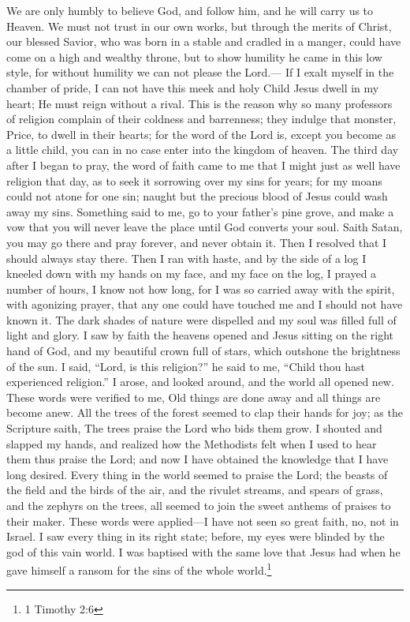 We are only humbly to believe God, and follow him, and he will carry us to Heaven.
We must not trust in our own works, but through the merits of Christ, our blessed Savior, who was born in a stable and cradled in a manger, could have come on a high and wealthy throne, but to show humility he came in this low style, for without humility we can not please the Lord.---
If I exalt myself in the chamber of pride, I can not have this meek and holy Child Jesus dwell in my heart; He must reign without a rival.
This is the reason why so many professors of religion complain of their coldness and barrenness; they indulge that monster, Price, to dwell in their hearts; for the word of the Lord is, except you become as a little child, you can in no case enter into the kingdom of heaven.
The third day after I began to pray, the word of faith came to me that I might just as well have religion that day, as to seek it sorrowing over my sins for years; for my moans could not atone for one sin; naught but the precious blood of Jesus could wash away my sins.
Something said to me, go to your father's pine grove, and make a vow that you will never leave the place until God converts your soul.
Saith Satan, you may go there and pray forever, and never obtain it.
Then I resolved that I should always stay there.
Then I ran with haste, and by the side of a log I kneeled down with my hands on my face, and my face on the log, I prayed a number of hours, I know not how long, for I was so carried away with the spirit, with agonizing prayer, that any one could have touched me and I should not have known it.
The dark shades of nature were dispelled and my soul was filled full of light and glory.
I saw by faith the heavens opened and Jesus sitting on the right hand of God, and my beautiful crown full of stars, which outshone the brightness of the sun.
I said, ``Lord, is this religion?'' he said to me, ``Child thou hast experienced religion.''
I arose, and looked around, and the world all opened new.
These words were verified to me, Old things are done away and all things are become anew.
All the trees of the forest seemed to clap their hands for joy; as the Scripture saith, The trees praise the Lord who bids them grow.
I shouted and slapped my hands, and realized how the Methodists felt when I used to hear them thus praise the Lord; and now I have obtained the knowledge that I have long desired.
Every thing in the world seemed to praise the Lord; the beasts of the field and the birds of the air, and the rivulet streams, and spears of grass, and the zephyrs on the trees, all seemed to join the sweet anthems of praises to their maker.
These words were applied---I have not seen so great faith, no, not in Israel.
I saw every thing in its right state; before, my eyes were blinded by the god of this vain world.
I was baptised with the same love that Jesus had when he gave himself a ransom for the sins of the whole world.\footnote{1 Timothy 2:6}
